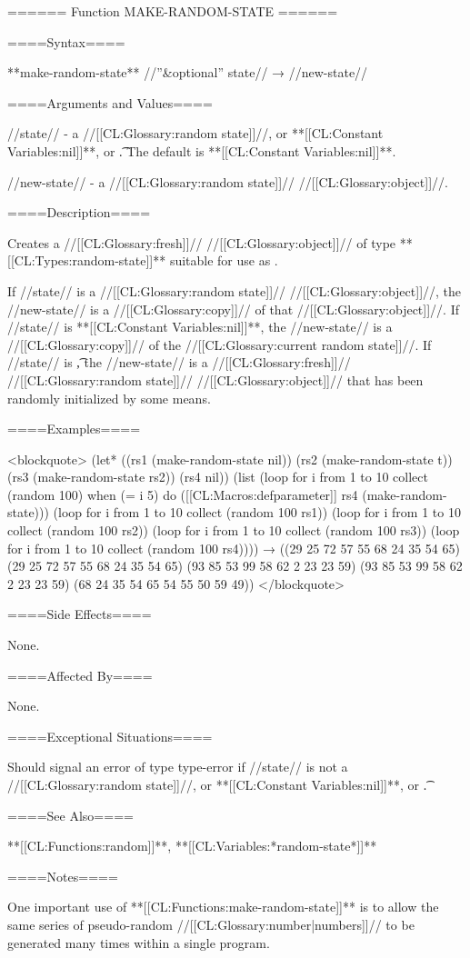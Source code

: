 ====== Function MAKE-RANDOM-STATE ======

====Syntax====

**make-random-state** //''&optional'' state// → //new-state//

====Arguments and Values====

//state// - a //[[CL:Glossary:random state]]//, or **[[CL:Constant Variables:nil]]**, or \t. The default is **[[CL:Constant Variables:nil]]**.

//new-state// - a //[[CL:Glossary:random state]]// //[[CL:Glossary:object]]//.

====Description====

Creates a //[[CL:Glossary:fresh]]// //[[CL:Glossary:object]]// of type **[[CL:Types:random-state]]** suitable for use as .

If //state// is a //[[CL:Glossary:random state]]// //[[CL:Glossary:object]]//, the //new-state// is a //[[CL:Glossary:copy]]// of that //[[CL:Glossary:object]]//. If //state// is **[[CL:Constant Variables:nil]]**, the //new-state// is a //[[CL:Glossary:copy]]// of the //[[CL:Glossary:current random state]]//. If //state// is \t, the //new-state// is a //[[CL:Glossary:fresh]]// //[[CL:Glossary:random state]]// //[[CL:Glossary:object]]// that has been randomly initialized by some means.

====Examples====

<blockquote> (let* ((rs1 (make-random-state nil)) (rs2 (make-random-state t)) (rs3 (make-random-state rs2)) (rs4 nil)) (list (loop for i from 1 to 10 collect (random 100) when (= i 5) do ([[CL:Macros:defparameter]] rs4 (make-random-state))) (loop for i from 1 to 10 collect (random 100 rs1)) (loop for i from 1 to 10 collect (random 100 rs2)) (loop for i from 1 to 10 collect (random 100 rs3)) (loop for i from 1 to 10 collect (random 100 rs4)))) → ((29 25 72 57 55 68 24 35 54 65) (29 25 72 57 55 68 24 35 54 65) (93 85 53 99 58 62 2 23 23 59) (93 85 53 99 58 62 2 23 23 59) (68 24 35 54 65 54 55 50 59 49)) </blockquote>

====Side Effects====

None.

====Affected By====

None.

====Exceptional Situations====

Should signal an error of type type-error if //state// is not a //[[CL:Glossary:random state]]//, or **[[CL:Constant Variables:nil]]**, or \t.

====See Also====

**[[CL:Functions:random]]**, **[[CL:Variables:*random-state*]]**

====Notes====

One important use of **[[CL:Functions:make-random-state]]** is to allow the same series of pseudo-random //[[CL:Glossary:number|numbers]]// to be generated many times within a single program.

